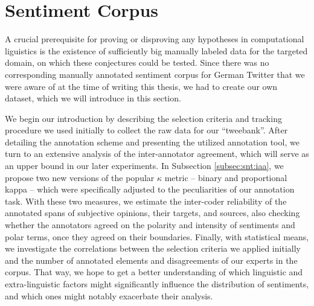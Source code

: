 

\section{Sentiment Corpus}\label{sec:snt:corpus}

A crucial prerequisite for proving or disproving any hypotheses in
computational liguistics is the existence of sufficiently big manually
labeled data for the targeted domain, on which these conjectures could
be tested.  Since there was no corresponding manually annotated
sentiment corpus for German Twitter that we were aware of at the time
of writing this thesis, we had to create our own dataset, which we
will introduce in this section.

We begin our introduction by describing the selection criteria and
tracking procedure we used initially to collect the raw data for our
``tweebank''.  After detailing the annotation scheme and presenting
the utilized annotation tool, we turn to an extensive analysis of the
inter-annotator agreement, which will serve as an upper bound in our
later experiments.  In Subsection \ref{subsec:snt:iaa}, we propose two
new versions of the popular $\kappa$ metric \cite{Cohen:60} -- binary
and proportional kappa -- which were specifically adjusted to the
peculiarities of our annotation task.  With these two measures, we
estimate the inter-coder reliability of the annotated spans of
subjective opinions, their targets, and sources, also checking whether
the annotators agreed on the polarity and intensity of sentiments and
polar terms, once they agreed on their boundaries.  Finally, with
statistical means, we investigate the correlations between the
selection criteria we applied initially and the number of annotated
elements and disagreements of our experts in the corpus.  That way, we
hope to get a better understanding of which linguistic and
extra-linguistic factors might significantly influence the
distribution of sentiments, and which ones might notably exacerbate
their analysis.

